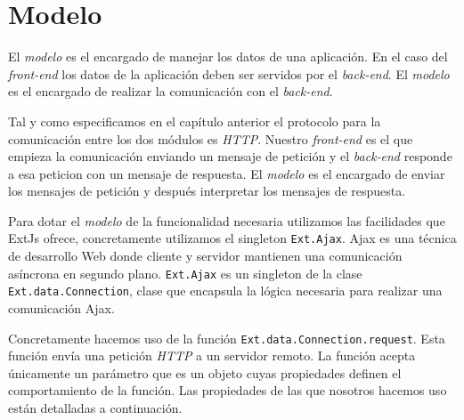 \section{Modelo}
	El \emph{modelo} es el encargado de manejar los datos de una aplicación. En el caso del \emph{front-end} los datos de la aplicación deben ser
	servidos por el \emph{back-end}. El \emph{modelo} es el encargado de realizar la comunicación con el \emph{back-end}. 
	\par
	Tal y como especificamos en el  capítulo anterior el protocolo para la comunicación entre los dos módulos es \emph{HTTP}. Nuestro
	\emph{front-end} es el que empieza la comunicación enviando un mensaje de petición y el \emph{back-end} responde a esa peticion con un mensaje
	de respuesta. El \emph{modelo} es el encargado de enviar los mensajes de petición y después interpretar los mensajes de respuesta.
	\par
	Para dotar el \emph{modelo} de la funcionalidad necesaria utilizamos las facilidades que ExtJs ofrece, concretamente utilizamos el singleton
	\texttt{Ext.Ajax}. Ajax\cite{AjaxWiki} es una técnica de desarrollo Web donde cliente y servidor mantienen una comunicación asíncrona en
	segundo plano. \texttt{Ext.Ajax} es un singleton de la clase \texttt{Ext.data.Connection}, clase que encapsula la lógica necesaria para
	realizar una comunicación Ajax. 
	\par
	Concretamente hacemos uso de la función \texttt{Ext.data.Connection.request}. Esta función envía una petición \emph{HTTP} a un servidor
	remoto. La función acepta únicamente un parámetro que es un objeto cuyas propiedades definen el comportamiento de la función. Las propiedades de las
	que nosotros hacemos uso están detalladas a continuación. 
